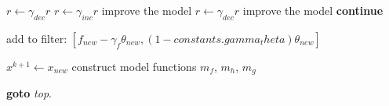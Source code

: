 \documentclass{article}
\begin{document}
\begin{algorithm}
\begin{algorithmic}[1]
	\State 
			\State $r \gets \gamma_{dec} r$
		\Else
			\State $r \gets \gamma_{inc} r$
		\EndIf
		\State improve the model
			\State $r \gets \gamma_{dec} r$
		\EndIf
		\State improve the model
	\Else
		\textbf{continue}
	\EndIf
	
	
	
		add to filter: $[f_{new} - \gamma_f \theta_{new}, (1 - constants.gamma_theta)  \theta_{new}]$
	\EndIf

	\State $x^{k+1} \gets x_{new}$
	\State construct model functions $m_f$, $m_h$, $m_g$
\EndIf
\EndWhile
% 
% 
% 
% 
% 
% 
% 
% 

% 
% 
% 

\State \textbf{goto} \emph{top}.
\EndProcedure
\end{algorithmic}
\end{algorithm}
\end{document}
